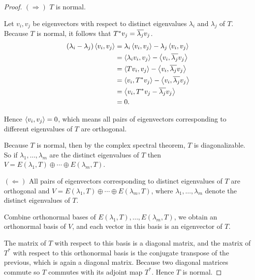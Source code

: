 \begin{proof}
    $(\Rightarrow)$ $T$ is normal.

    Let $v_{i}, v_{j}$ be eigenvectors with respect to distinct eigenvalues $\lambda_{i}$ and $\lambda_{j}$ of $T$. Because $T$ is normal, it follows that $T^{*}v_{j} = \overline{\lambda_{j}}v_{j}$.
    \begin{align*}
        (\lambda_{i} - \lambda_{j})\left\langle{v_{i}, v_{j}}\right\rangle & = \lambda_{i}\left\langle{v_{i}, v_{j}}\right\rangle - \lambda_{j}\left\langle{v_{i}, v_{j}}\right\rangle        \\
                                                            & = \left\langle{\lambda_{i}v_{i}, v_{j}}\right\rangle - \left\langle{v_{i}, \overline{\lambda_{j}}v_{j}}\right\rangle \\
                                                            & = \left\langle{Tv_{i}, v_{j}}\right\rangle - \left\langle{v_{i}, \overline{\lambda_{j}}v_{j}}\right\rangle           \\
                                                            & = \left\langle{v_{i}, T^{*}v_{j}}\right\rangle - \left\langle{v_{i}, \overline{\lambda_{j}}v_{j}}\right\rangle       \\
                                                            & = \left\langle{v_{i}, T^{*}v_{j} - \overline{\lambda_{j}}v_{j}}\right\rangle                          \\
                                                            & = 0.
    \end{align*}

    Hence $\left\langle{v_{i}, v_{j}}\right\rangle = 0$, which means all pairs of eigenvectors corresponding to different eigenvalues of $T$ are orthogonal.

    Because $T$ is normal, then by the complex spectral theorem, $T$ is diagonalizable. So if $\lambda_{1}, \ldots, \lambda_{m}$ are the distinct eigenvalues of $T$ then $V = E(\lambda_{1}, T)\oplus \cdots\oplus E(\lambda_{m}, T)$.

    \bigskip
    $(\Leftarrow)$ All pairs of eigenvectors corresponding to distinct eigenvalues of $T$ are orthogonal and $V = E(\lambda_{1}, T)\oplus \cdots\oplus E(\lambda_{m}, T)$, where $\lambda_{1}, \ldots, \lambda_{m}$ denote the distinct eigenvalues of $T$.

    Combine orthonormal bases of $E(\lambda_{1}, T), \ldots, E(\lambda_{m}, T)$, we obtain an orthonormal basis of $V$, and each vector in this basis is an eigenvector of $T$.

    The matrix of $T$ with respect to this basis is a diagonal matrix, and the matrix of $T^{*}$ with respect to this orthonormal basis is the conjugate transpose of the previous, which is again a diagonal matrix. Because two diagonal matrices commute so $T$ commutes with its adjoint map $T^{*}$. Hence $T$ is normal.
\end{proof}
\newpage

